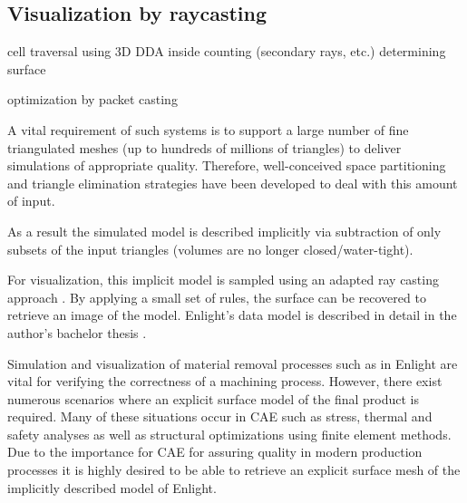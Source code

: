 \subsection{Visualization by raycasting}
\label{sec:raycasting}

cell traversal using 3D DDA
inside counting (secondary rays, etc.)
determining surface

optimization by packet casting




A vital requirement of such systems is to support a large number of fine triangulated meshes (up to hundreds of millions of triangles) to deliver simulations of appropriate quality.
Therefore, well-conceived space partitioning and triangle elimination strategies have been developed to deal with this amount of input.

As a result the simulated model is described implicitly via subtraction of only subsets of the input triangles (volumes are no longer closed/water-tight).

For visualization, this implicit model is sampled using an adapted ray casting approach \cite{enlight}.
By applying a small set of rules, the surface can be recovered to retrieve an image of the model.
Enlight's data model is described in detail in the author's bachelor thesis \cite{bachelor}.

Simulation and visualization of material removal processes such as in Enlight are vital for verifying the correctness of a machining process.
However, there exist numerous scenarios where an explicit surface model of the final product is required.
Many of these situations occur in CAE such as stress, thermal and safety analyses as well as structural optimizations using finite element methods.
Due to the importance for CAE for assuring quality in modern production processes it is highly desired to be able to retrieve an explicit surface mesh of the implicitly described model of Enlight.

